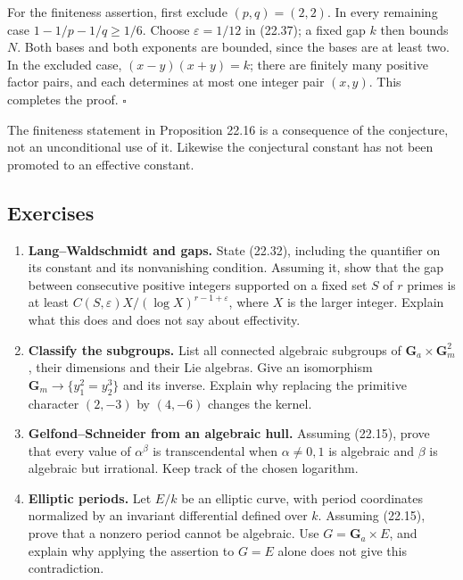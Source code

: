 \documentclass[
  11pt,
  a4paper,
]{article}
\providecommand{\tightlist}{%
  \setlength{\itemsep}{0pt}\setlength{\parskip}{0pt}}
\begin{document}
For the finiteness assertion, first exclude \((p,q)=(2,2)\). In every
remaining case \(1-1/p-1/q\ge1/6\). Choose \(\varepsilon=1/12\) in
(22.37); a fixed gap \(k\) then bounds \(N\). Both bases and both
exponents are bounded, since the bases are at least two. In the excluded
case, \((x-y)(x+y)=k\); there are finitely many positive factor pairs,
and each determines at most one integer pair \((x,y)\). This completes
the proof. \(\square\)

The finiteness statement in Proposition 22.16 is a consequence of the
conjecture, not an unconditional use of it. Likewise the conjectural
constant has not been promoted to an effective constant.

\subsection{Exercises}\label{exercises}

\begin{enumerate}
\def\labelenumi{\arabic{enumi}.}
\tightlist
\item
  \textbf{Lang--Waldschmidt and gaps.} State (22.32), including the
  quantifier on its constant and its nonvanishing condition. Assuming
  it, show that the gap between consecutive positive integers supported
  on a fixed set \(S\) of \(r\) primes is at least
  \(C(S,\varepsilon)X/(\log X)^{r-1+\varepsilon}\), where \(X\) is the
  larger integer. Explain what this does and does not say about
  effectivity.
\item
  \textbf{Classify the subgroups.} List all connected algebraic
  subgroups of \(\mathbf G_a\times\mathbf G_m^2\), their dimensions and
  their Lie algebras. Give an isomorphism
  \(\mathbf G_m\to\{y_1^2=y_2^3\}\) and its inverse. Explain why
  replacing the primitive character \((2,-3)\) by \((4,-6)\) changes the
  kernel.
\item
  \textbf{Gelfond--Schneider from an algebraic hull.} Assuming (22.15),
  prove that every value of \(\alpha^\beta\) is transcendental when
  \(\alpha\ne0,1\) is algebraic and \(\beta\) is algebraic but
  irrational. Keep track of the chosen logarithm.
\item
  \textbf{Elliptic periods.} Let \(E/k\) be an elliptic curve, with
  period coordinates normalized by an invariant differential defined
  over \(k\). Assuming (22.15), prove that a nonzero period cannot be
  algebraic. Use \(G=\mathbf G_a\times E\), and explain why applying the
  assertion to \(G=E\) alone does not give this contradiction.
\end{enumerate}
\end{document}

